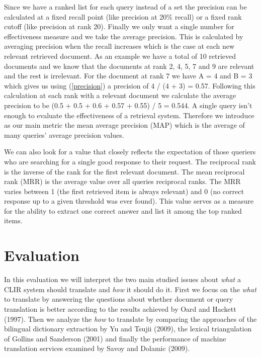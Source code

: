 \documentclass[journal]{IEEEtran}
\begin{document}
Since we have a ranked list for each query instead of a set the precision can be calculated at a fixed recall point (like precision at 20\% recall) or a fixed rank cutoff (like precision at rank 20).
Finally we only want a single number for effectiveness measure and we take the average precision.
This is calculated by averaging precision when the recall increases which is the case at each new relevant retrieved document.
As an example we have a total of 10 retrieved documents and we know that the documents at rank 2, 4, 5, 7 and 9 are relevant and the rest is irrelevant.
For the document at rank 7 we have A = 4 and B = 3 which gives us using (\ref{precision}) a precision of 4 / (4 + 3) = 0.57.
Following this calculation at each rank with a relevant document we calculate the average precision to be (0.5 + 0.5 + 0.6 + 0.57 + 0.55) / 5 = 0.544.
A single query isn't enough to evaluate the effectiveness of a retrieval system.
Therefore we introduce as our main metric the mean average precision (MAP) which is the average of many queries' average precision values.

We can also look for a value that closely reflects the expectation of those queriers who are searching for a single good response to their request.
The reciprocal rank is the inverse of the rank for the first relevant document.
The mean reciprocal rank (MRR) is the average value over all queries reciprocal ranks.
The MRR varies between 1 (the first retrieved item is always relevant) and 0 (no correct response up to a given threshold was ever found).
This value serves as a measure for the ability to extract one correct answer and list it among the top ranked items.



\section{Evaluation}
In this evaluation we will interpret the two main studied issues about \textit{what} a CLIR system should translate and \textit{how} it should do it.
First we focus on the \textit{what} to translate by answering the questions about whether document or query translation is better according to the results achieved by Oard and Hackett (1997).
Then we analyze the \textit{how} to translate by comparing the approaches of the bilingual dictionary extraction by Yu and Tsujii (2009), the lexical triangulation of Gollins and Sanderson (2001) and finally the performance of machine translation services examined by Savoy and Dolamic (2009).
\end{document}
